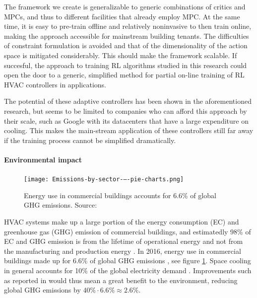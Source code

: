\documentclass{article}
\theoremstyle{definition}
\theoremstyle{remark}
\begin{document}
The framework we create is generalizable to generic combinations of critics and MPCs, and thus to different facilities that already employ MPC. At the same time, it is easy to pre-train offline and relatively noninvasive to then train online, making the approach accessible for mainstream building tenants. The difficulties of constraint formulation is avoided and that of the dimensionality of the action space is mitigated considerably. This should make the framework scalable. If succesful, the approach to training RL algorithms studied in this research could open the door to a generic, simplified method for partial on-line training of RL HVAC controllers in applications. 

The potential of these adaptive controllers has been shown in the aforementioned research, but seems to be limited to companies who can afford this approach by their scale, such as Google with its datacenters that have a large expenditure on cooling. This makes the main-stream application of these controllers still far away if the training process cannot be simplified dramatically.

\FloatBarrier
\paragraph{Environmental impact}



\begin{figure}
    \centering
    \texttt{[image: Emissions-by-sector-–-pie-charts.png]}
    \caption{Energy use in commercial buildings accounts for 6.6\% of global GHG emissions. Source: \cite{owidco2andgreenhousegasemissions}}
    \label{fig:ghg emissions}
\end{figure}

HVAC systems make up a large portion of the energy consumption (EC) and greenhouse gas (GHG) emission of commercial buildings, and estimatedly 98\% of EC and GHG emission is from the lifetime of operational energy and not from the manufacturing and production energy \cite{co2emissionsfromhvacequipment,COLE1998335,SUZUKI199833,lifecycleenergyanalysis}. In 2016, energy use in commercial buildings made up for 6.6\% of global GHG emissions \cite{owidco2andgreenhousegasemissions}, see figure \ref{fig:ghg emissions}. Space cooling in general accounts for 10\% of the global electricity demand \cite{futureofcooling}. Improvements such as reported in \cite{evans_gao_2016} would thus mean a great benefit to the environment, reducing global GHG emissions by $40\% \cdot 6.6\% \approx 2.6 \%$. 
\end{document}
